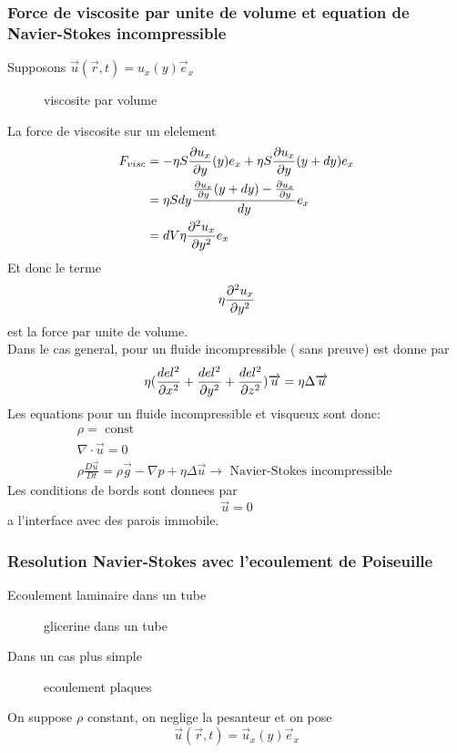 \documentclass[../main.tex]{subfiles}
\begin{document}
\subsubsection{Force de viscosite par unite de volume et equation de Navier-Stokes incompressible}
Supposons $\vec{u}( \vec{r},t) = u_x( y) \vec{e}_x$
\begin{figure}[H]
    \centering
    \caption{viscosite par volume}
    \label{fig:viscosite-par-volume}
\end{figure}
La force de viscosite sur un elelement
\begin{align*}
	F_{visc} &= - \eta S \frac{\partial u_x}{\partial y}( y) e_x + \eta S \frac{\partial u_x}{\partial y}( y+ dy) e_x\\
		 &= \eta S dy \frac{ \frac{\partial u_x}{\partial y}( y+dy) - \frac{\partial u_x}{\partial y}}{dy} e_x\\
		 &= dV \eta \frac{\partial ^{2} u_x}{\partial y^{2}}e_x
\end{align*}
Et donc le terme
\[ 
\eta \frac{\partial ^{2} u_x}{\partial y^{2}}
\]
est la force par unite de volume.\\
Dans le cas general, pour un fluide incompressible ( sans preuve) est donne par
\[ 
	\eta ( \frac{del^{2}}{\partial x^{2}}+\frac{del^{2}}{\partial y^{2}}+\frac{del^{2}}{\partial z^{2}}) \overrightarrow{u} = \eta \Delta \overrightarrow{u}
\]
Les equations pour un fluide incompressible et visqueux sont donc:
\begin{align*}
\rho = \text{ const } \\
\nabla \cdot \vec{u} = 0\\
\rho \frac{D \vec{u}}{Dt} = \rho \vec{g} - \nabla p + \eta \Delta \vec{u}\rightarrow \text{ Navier-Stokes incompressible } 
\end{align*}
Les conditions de bords sont donnees par
\[ 
\vec{u}=0
\]
a l'interface avec des parois immobile.
\subsubsection{Resolution Navier-Stokes avec l'ecoulement de Poiseuille}
Ecoulement laminaire dans un tube
\begin{figure}[H]
    \centering
    \caption{glicerine dans un tube}
    \label{fig:glicerine-dans-un-tube}
\end{figure}

Dans un cas plus simple
\begin{figure}[H]
    \centering
    \caption{ecoulement plaques}
    \label{fig:ecoulement-plaques}
\end{figure}
On suppose $\rho$ constant, on neglige la pesanteur et on pose
\[ 
	\vec{u}( \vec{r},t) = \vec{u}_x( y) \vec{e}_x
\]
\end{document}
